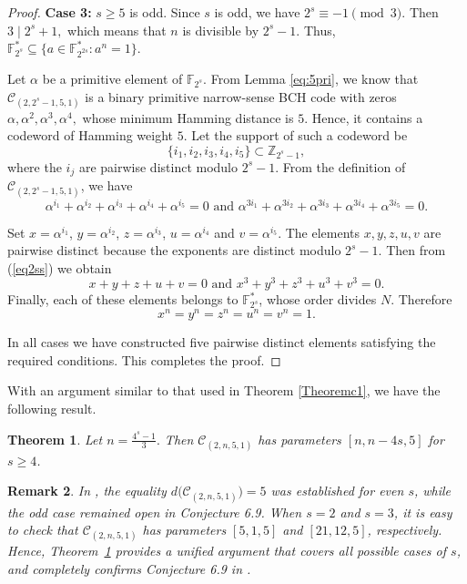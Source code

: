 \documentclass[12pt,draftcls,journal,onecolumn]{IEEEtran}
\newtheorem{theorem}{Theorem}
\newtheorem{remark}[theorem]{Remark}
\begin{document}
\begin{proof}
\medskip

\noindent
\textbf{Case 3: } $s\ge5$ is odd.
Since $s$ is odd, we have
$
2^s\equiv -1\pmod 3.
$
Then
$
3\mid 2^s+1,
$
which means that
$n$
is divisible by $2^s-1$. Thus,
$
\mathbb{F}_{2^s}^*
\subseteq
\{a\in\mathbb{F}_{2^{2s}}^*:a^n=1\}.
$

Let $\alpha$ be a primitive element of $\mathbb{F}_{2^s}$. From Lemma \ref{eq:5pri}, we know that \(\mathcal C_{(2,2^s-1,5,1)}\) is a binary primitive narrow-sense BCH code
with zeros
$\alpha,\alpha^2,\alpha^3,\alpha^4,$
whose minimum
Hamming distance is $5$. Hence, it contains a codeword of Hamming
weight $5$. Let the support of such a codeword be
\[
\{i_1,i_2,i_3,i_4,i_5\}\subset \mathbb Z_{2^s-1},
\]
where the \(i_j\) are pairwise distinct modulo \(2^s-1\). From the definition of \(\mathcal C_{(2,2^s-1,5,1)}\),  we have
\begin{equation}\label{eq2ss}
\alpha^{i_1}+\alpha^{i_2}+\alpha^{i_3}+\alpha^{i_4}+\alpha^{i_5}=0\,\, \text{and}\,\,\alpha^{3i_1}+\alpha^{3i_2}+\alpha^{3i_3}+\alpha^{3i_4}+\alpha^{3i_5}=0.
\end{equation}

Set
$x=\alpha^{i_1}$, $y=\alpha^{i_2}$, $z=\alpha^{i_3}$, $u=\alpha^{i_4}$ and $v=\alpha^{i_5}$.
The elements \(x,y,z,u,v\) are pairwise distinct because the exponents are distinct modulo \(2^s-1\). Then from (\ref{eq2ss}) we obtain
$$
x+y+z+u+v=0\,\, \text{and}\,\,
x^3+y^3+z^3+u^3+v^3=0.
$$
Finally, each of these elements belongs to \(\mathbb F_{2^s}^*\), whose order divides \(N\). Therefore
\[
x^n=y^n=z^n=u^n=v^n=1.
\]

In all cases we have constructed five pairwise distinct elements satisfying the required conditions. This completes the proof.
\end{proof}

With an argument similar to that used in Theorem \ref{Theoremc1}, we have the following result.

\begin{theorem}\label{Theoremc3}
Let $n=\frac{4^s-1}{3}.$ Then $\mathcal{C}_{(2,n,5,1)}$ has parameters $[n,n-4s,5]$ for $s\geq4$.
\end{theorem}


\begin{remark}
In \cite{Chen59}, the equality
$
d\bigl(\mathcal{C}_{(2,n,5,1)}\bigr)=5
$
was established for even $s$, while the odd case remained open in Conjecture 6.9. When $s=2$ and $s=3$, it is easy to check that $\mathcal{C}_{(2,n,5,1)}$ has parameters $[5,1,5]$ and $[21,12,5]$, respectively.  Hence, Theorem~\ref{Theoremc3} provides a unified argument that covers all possible cases of $s$, and completely confirms Conjecture 6.9 in \cite{Chen59}.
\end{remark}
\end{document}
